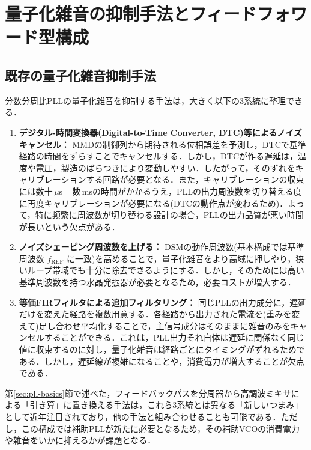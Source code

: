 \section{量子化雑音の抑制手法とフィードフォワード型構成}
\label{sec:methods}

\subsection{既存の量子化雑音抑制手法}

分数分周比PLLの量子化雑音を抑制する手法は，大きく以下の3系統に整理できる．

\begin{enumerate}
  \item \textbf{デジタル-時間変換器(Digital-to-Time Converter, DTC)等によるノイズキャンセル：} MMDの制御列から期待される位相誤差を予測し，DTCで基準経路の時間をずらすことでキャンセルする．しかし，DTCが作る遅延は，温度や電圧，製造のばらつきにより変動しやすい．したがって，そのずれをキャリブレーションする回路が必要となる．また，キャリブレーションの収束には数十\,$\mu$s ~ 数\,msの時間がかかるうえ，PLLの出力周波数を切り替える度に再度キャリブレーションが必要になる(DTCの動作点が変わるため)．よって，特に頻繁に周波数が切り替わる設計の場合，PLLの出力品質が悪い時間が長いという欠点がある．
  \item \textbf{ノイズシェーピング周波数を上げる：} DSMの動作周波数(基本構成では基準周波数 $f_\text{REF}$ に一致)を高めることで，量子化雑音をより高域に押しやり，狭いループ帯域でも十分に除去できるようにする．しかし，そのためには高い基準周波数を持つ水晶発振器が必要となるため，必要コストが増大する．
  \item \textbf{等価FIRフィルタによる追加フィルタリング：} 同じPLLの出力成分に，遅延だけを変えた経路を複数用意する．各経路から出力された電流を(重みを変えて)足し合わせ平均化することで，主信号成分はそのままに雑音のみをキャンセルすることができる．これは，PLL出力それ自体は遅延に関係なく同じ値に収束するのに対し，量子化雑音は経路ごとにタイミングがずれるためである．しかし，遅延線が複雑になることや，消費電力が増大することが欠点である．
\end{enumerate}

第\ref{sec:pll-basics}節で述べた，フィードバックパスを分周器から高調波ミキサによる「引き算」に置き換える手法は，これら3系統とは異なる「新しいつまみ」として近年注目されており，他の手法と組み合わせることも可能である．ただし，この構成では補助PLLが新たに必要となるため，その補助VCOの消費電力や雑音をいかに抑えるかが課題となる．

